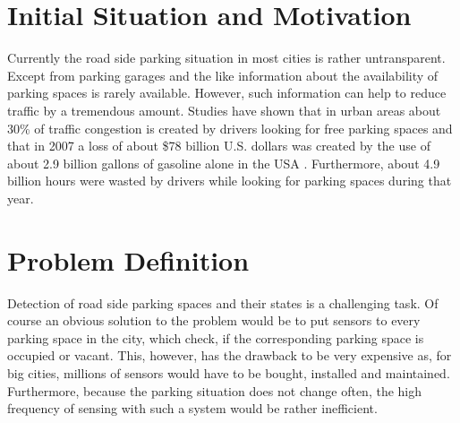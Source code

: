 \documentclass[11pt,a4paper,titlepage,
chapterprefix,headsepline,parskip,pdftex,
,pointlessnumbers,bibtotoc]{article}
\begin{document}


%
%
%
%

\newpage
{}

\section{Initial Situation and Motivation}
Currently the road side parking situation in most cities is rather untransparent. Except from parking garages and the like information about the availability of parking spaces is rarely available. However, such information can help to reduce traffic by a tremendous amount. Studies have shown that in urban areas about 30\% of traffic congestion is created by drivers looking for free parking spaces \cite{Nawaz:2013:PSB:2500423.2500438} and that in 2007 a loss of about \$78 billion U.S. dollars was created by the use of about 2.9 billion gallons of gasoline alone in the USA \cite{TexasMobilityReport}. Furthermore, about 4.9 billion hours were wasted by drivers while looking for parking spaces during that year. 

\section{Problem Definition}

Detection of road side parking spaces and their states is a challenging task. Of course an obvious solution to the problem would be to put sensors to every parking space in the city, which check, if the corresponding parking space is occupied or vacant. This, however, has the drawback to be very expensive as, for big cities, millions of sensors would have to be bought, installed and maintained. Furthermore, because the parking situation does not change often, the high frequency of sensing with such a system would be rather inefficient.



\end{document}
